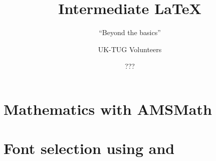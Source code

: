 \usepackage[T1]{fontenc}
\usepackage{babel,booktabs,csquotes,lmodern,tikz,verbatim}

\newcommand*\BibTeX{BibTeX}
\newcommand*\cls[1]{\textsf{#1}}
\newcommand*\cs[1]{\texttt{\char`\\#1}}
\newcommand*\marg[1]{\texttt{\char`\{#1\char`\}}}
\newcommand*\meta[1]{\ensuremath{\langle}\emph{#1}\ensuremath{\rangle}}
\newcommand*\oarg[1]{\texttt{[#1]}}
\newcommand*\pkg[1]{\textsf{#1}}

\renewcommand*\LaTeX{LaTeX}
\renewcommand*\LaTeXe{LaTeX2e}
\renewcommand*\TeX{TeX}

\title{Intermediate \LaTeX{}}
\subtitle{\enquote{Beyond the basics}}
\date{???}
\author{UK-TUG Volunteers}



\begin{frame}
  \titlepage
\end{frame}



\section{Mathematics with AMSMath}

\section{Font selection using \XeTeX{} and \LuaTeX{}}

